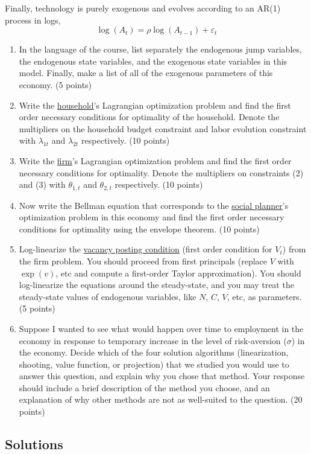 \documentclass[10pt]{article}
\begin{document}
Finally, technology is purely exogenous and evolves according to an AR(1) process in logs,
\[
\log(A_t) = \rho \log(A_{t-1}) + \varepsilon_t
\]



\begin{enumerate}
	\item In the language of the course, list separately the endogenous jump variables, the endogenous state variables, and the exogenous state variables in this model. Finally, make a list of all of the exogenous parameters of this economy. (5 points)
	\item Write the \underline{household}'s Lagrangian optimization problem and find the first order necessary conditions for optimality of the household. Denote the multipliers on the household budget constraint and labor evolution constraint with $\lambda_{1t}$ and $\lambda_{2t}$ respectively. (10 points)
	\item Write the \underline{firm}'s Lagrangian optimization problem and find the first order necessary conditions for optimality. Denote the multipliers on constraints (2) and (3) with $\theta_{1,t}$ and $\theta_{2,t}$ respectively. (10 points)
	\item Now write the Bellman equation that corresponds to the \underline{social planner}'s optimization problem in this economy and find the first order necessary conditions for optimality using the envelope theorem. (10 points)
	\item Log-linearize the \underline{vacancy posting condition} (first order condition for $V_t$) from the firm problem. You should proceed from first principals (\ie replace $V$ with $\exp(v)$, etc and compute a first-order Taylor approximation). You should log-linearize the equations around the steady-state, and you may treat the steady-state values of endogenous variables, like $N$, $C$, $V$, etc, as parameters. (5 points)
	\item Suppose I wanted to see what would happen over time to employment in the economy in response to temporary increase in the level of risk-aversion ($\sigma$) in the economy. Decide which of the four solution algorithms (linearization, shooting, value function, or projection) that we studied you would use to answer this question, and explain why you chose that method. Your response should include a brief description of the method you choose, and an explanation of why other methods are not as well-suited to the question. (20 points)
\end{enumerate}
\subsection{Solutions}
\end{document}
